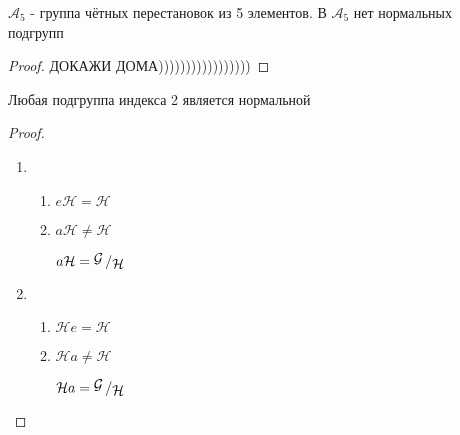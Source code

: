 \documentclass[../main/document.tex]{subfiles}
\begin{document}
\begin{exm}
$\mathcal{A}_5$ - группа чётных перестановок из 5 элементов. В $\mathcal{A}_5$ нет нормальных подгрупп
\begin{proof}
ДОКАЖИ ДОМА)))))))))))))))))
\end{proof}
\end{exm}

\begin{thm}
Любая подгруппа индекса 2 является нормальной
\begin{proof}
\begin{enumerate}
\item \begin{enumerate}
\item $e\mathcal{H}=\mathcal{H}$
\item $a\mathcal{H}\neq\mathcal{H}$

$a\mathcal{H}=\bigslant{\mathcal{G}}{\mathcal{H}}$
\end{enumerate}
\item \begin{enumerate}
\item $\mathcal{H}e=\mathcal{H}$
\item $\mathcal{H}a\neq\mathcal{H}$

$\mathcal{H}a=\bigslant{\mathcal{G}}{\mathcal{H}}$
\end{enumerate}
\end{enumerate}
\end{proof}
\end{thm}
\end{document}
